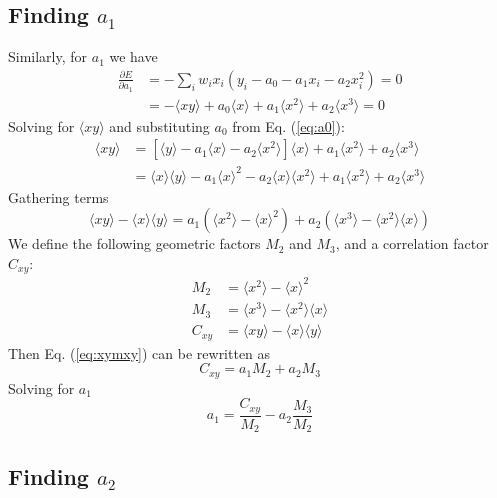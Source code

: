 \documentclass[oneside]{tufte-handout}
\begin{document}
\begin{fullwidth}
\subsection{Finding $a_1$}
Similarly, for $a_1$ we have
\begin{align}
\frac{\partial E}{\partial a_1} &= - \sum_i w_i x_i (y_i - a_0 - a_1 x_i - a_2 x_i^2) = 0 \\
                                &= - \langle x y \rangle + a_0 \langle x \rangle + a_1 \langle x^2 \rangle + a_2 \langle x^3 \rangle = 0
\end{align}
Solving for $\langle x y \rangle$ and substituting $a_0$ from Eq. (\ref{eq:a0}):
\begin{align}
\langle x y \rangle &= \left[\langle y \rangle - a_1 \langle x \rangle - a_2 \langle x^2 \rangle \right] \langle x \rangle + a_1 \langle x^2 \rangle + a_2 \langle x^3 \rangle \\
                    &= \langle x \rangle \langle y \rangle - a_1 \langle x \rangle^2 - a_2 \langle x \rangle \langle x^2 \rangle + a_1 \langle x^2 \rangle + a_2 \langle x^3 \rangle
\end{align}
Gathering terms
\begin{equation}\label{eq:xymxy}
\langle x y \rangle - \langle x \rangle \langle y \rangle = a_1 (\langle x^2 \rangle - \langle x \rangle^2) + a_2 (\langle x^3 \rangle - \langle x^2 \rangle \langle x \rangle)
\end{equation}
We define the following geometric factors $M_2$ and $M_3$, and a correlation factor $C_{xy}$:
\begin{align}
M_2 &= \langle x^2 \rangle - \langle x \rangle^2 \label{eq:m2} \\
M_3 &= \langle x^3 \rangle - \langle x^2 \rangle \langle x \rangle  \label{eq:m3} \\
C_{xy} &= \langle x y \rangle - \langle x \rangle \langle y \rangle \label{eq:cxy}
\end{align}
Then Eq. (\ref{eq:xymxy}) can be rewritten as
\begin{equation}
C_{xy} = a_1 M_2 + a_2 M_3
\end{equation}
Solving for $a_1$
\begin{equation}\label{eq:a1}
a_1 = \frac{C_{xy}}{M_2} - a_2 \frac{M_3}{M_2}
\end{equation}

\subsection{Finding $a_2$}


\end{fullwidth}
\end{document}
